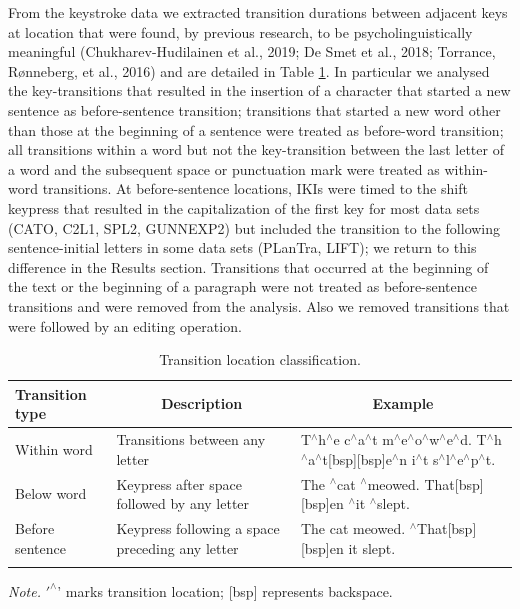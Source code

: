 \documentclass[
  man,floatsintext]{apa7}
\begin{document}
From the keystroke data we extracted transition durations between adjacent keys at location that were found, by previous research, to be psycholinguistically meaningful (Chukharev-Hudilainen et al., 2019; De Smet et al., 2018; Torrance, Rønneberg, et al., 2016) and are detailed in Table \ref{tab:keyloc}. In particular we analysed the key-transitions that resulted in the insertion of a character that started a new sentence as before-sentence transition; transitions that started a new word other than those at the beginning of a sentence were treated as before-word transition; all transitions within a word but not the key-transition between the last letter of a word and the subsequent space or punctuation mark were treated as within-word transitions. At before-sentence locations, IKIs were timed to the shift keypress that resulted in the capitalization of the first key for most data sets (CATO, C2L1, SPL2, GUNNEXP2) but included the transition to the following sentence-initial letters in some data sets (PLanTra, LIFT); we return to this difference in the Results section. Transitions that occurred at the beginning of the text or the beginning of a paragraph were not treated as before-sentence transitions and were removed from the analysis. Also we removed transitions that were followed by an editing operation.

\begin{table}[tbp]

\begin{center}
\begin{threeparttable}

\caption{\label{tab:keyloc}Transition location classification.}

\footnotesize{

\begin{tabular}{p{3cm}p{5cm}p{6cm}}
\toprule
Transition type & \multicolumn{1}{c}{Description} & \multicolumn{1}{c}{Example}\\
\midrule
Within word & Transitions between any letter & T$^{\wedge}$h$^{\wedge}$e c$^{\wedge}$a$^{\wedge}$t m$^{\wedge}$e$^{\wedge}$o$^{\wedge}$w$^{\wedge}$e$^{\wedge}$d. T$^{\wedge}$h$^{\wedge}$a$^{\wedge}$t[bsp][bsp]e$^{\wedge}$n i$^{\wedge}$t s$^{\wedge}$l$^{\wedge}$e$^{\wedge}$p$^{\wedge}$t.\\
Below word & Keypress after space followed by any letter & The $^{\wedge}$cat $^{\wedge}$meowed. That[bsp][bsp]en $^{\wedge}$it $^{\wedge}$slept.\\
Before sentence & Keypress following a space preceding any letter & The cat meowed. $^{\wedge}$That[bsp][bsp]en it slept.\\
\bottomrule
\addlinespace
\end{tabular}

}

\begin{tablenotes}[para]
\normalsize{\textit{Note.} $'^{\wedge}$' marks transition location; [bsp] represents backspace.}
\end{tablenotes}

\end{threeparttable}
\end{center}

\end{table}
\end{document}
